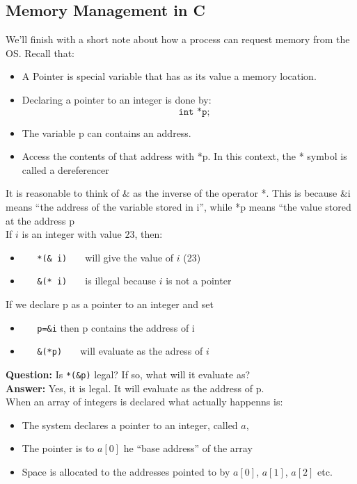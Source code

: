 \documentclass[a4paper, 10pt]{article}
\begin{document}
\subsection{Memory Management in C}
We'll finish with a short note about how a process can request memory from the OS. Recall that:
\begin{itemize}
    \item A Pointer is special variable that has as its value a memory location.
    \item Declaring a pointer to an integer is done by:
          $$\texttt{~~ int *p;}$$
    \item The variable p can contains an address.
    \item Access the contents of that address with *p.
          In this context, the * symbol is called a dereferencer
\end{itemize}
It is reasonable to think of \& as the inverse of the operator *. This is because \&i means “the address of the variable stored in i”, while *p means “the value stored at the address p \\[2ex]
If $i$ is an integer with value $23$, then:
\begin{itemize}
    \item \texttt{~~ *(\& i) ~~} will give the value of $i$ (23)
    \item \texttt{~~ \&(* i) ~~} is illegal because $i$ is not a pointer
\end{itemize}
If we declare p as a pointer to an integer and set
\begin{itemize}
    \item \texttt{~~ p=\&i} then p contains the address of i
    \item \texttt{~~ \&(*p) ~~} will evaluate as the adress of $i$
\end{itemize}
\textbf{Question:} Is  \texttt{*(\&p)} legal? If so, what will it evaluate as? \\
\textbf{Answer:} Yes, it is legal. It will evaluate as the address of p. \\[2ex]
When an array of integers is declared what actually happenns is:
\begin{itemize}
    \item The system declares a pointer to an integer, called $a$,
    \item The pointer is to $a[0]$ he “base address” of the array
    \item Space is allocated to the addresses pointed to by $a[0]$, $a[1]$, $a[2]$ etc.
\end{itemize}
\end{document}
